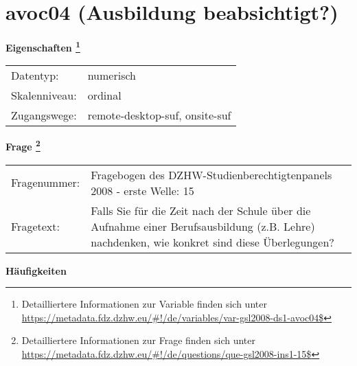 
    \setcounter{footnote}{0}

    \vspace*{-1.8cm}
	\section{avoc04 (Ausbildung beabsichtigt?)}
	\label{section:avoc04}



    \vspace*{0.5cm}
    \noindent\textbf{Eigenschaften
	\footnote{Detailliertere Informationen zur Variable finden sich unter
		\url{https://metadata.fdz.dzhw.eu/\#!/de/variables/var-gsl2008-ds1-avoc04$}}}\\
	\begin{tabularx}{\hsize}{@{}lX}
	Datentyp: & numerisch \\
	Skalenniveau: & ordinal \\
	Zugangswege: &
	  remote-desktop-suf, 
	  onsite-suf
 \\
    \end{tabularx}



				\vspace*{0.5cm}
                \noindent\textbf{Frage
	                \footnote{Detailliertere Informationen zur Frage finden sich unter
		              \url{https://metadata.fdz.dzhw.eu/\#!/de/questions/que-gsl2008-ins1-15$}}}\\
				\begin{tabularx}{\hsize}{@{}lX}
					Fragenummer: &
					  Fragebogen des DZHW-Studienberechtigtenpanels 2008 - erste Welle:
					  15
 \\
					Fragetext: & Falls Sie für die Zeit nach der Schule über die Aufnahme einer Berufsausbildung (z.B. Lehre) nachdenken, wie konkret sind diese Überlegungen? \\
				\end{tabularx}





        		\vspace*{0.5cm}
                \noindent\textbf{Häufigkeiten}

